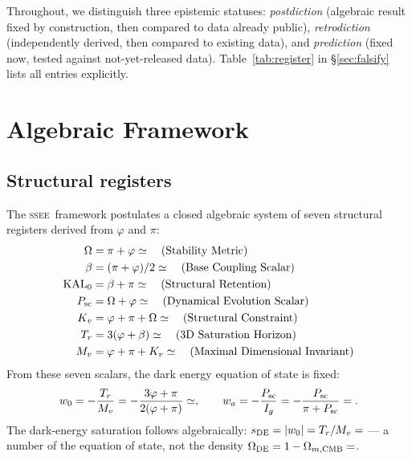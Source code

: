 \documentclass[12pt,a4paper]{article}
\newcommand{\SSEE}{\textsc{ssee}}
\newcommand{\phiG}{\varphi}
\newcommand{\KAL}{\mathrm{KAL}_0}
\newcommand{\Omde}{\Omega_{\mathrm{DE}}}
\newcommand{\OmmCMB}{\Omega_{m,\mathrm{CMB}}}
\newcommand{\wz}{w_0}
\newcommand{\wa}{w_a}
\begin{document}
Throughout, we distinguish three epistemic statuses: \textit{postdiction}
(algebraic result fixed by construction, then compared to data already public),
\textit{retrodiction} (independently derived, then compared to existing data),
and \textit{prediction} (fixed now, tested against not-yet-released data).
Table~\ref{tab:register} in \S\ref{sec:falsify} lists all entries explicitly.


\section{Algebraic Framework}
\label{sec:theory}

\subsection{Structural registers}
\label{sec:registers}

The \SSEE\ framework postulates a closed algebraic system of seven structural
registers derived from $\phiG$ and $\pi$:
\begin{align}
  \Omega   &= \pi + \phiG                   \simeq \val{OMEGA_d4} \quad (\text{Stability Metric})  \nonumber\\
  \beta    &= (\pi + \phiG)/2               \simeq \val{BETA_d4} \quad (\text{Base Coupling Scalar}) \nonumber\\
  \KAL     &= \beta + \pi                   \simeq \val{KAL0_d4} \quad (\text{Structural Retention}) \nonumber\\
  P_{\rm sc} &= \Omega + \phiG             \simeq \val{P_SC_d4} \quad (\text{Dynamical Evolution Scalar}) \nonumber\\
  K_v      &= \phiG + \pi + \Omega         \simeq \val{K_V_d4} \quad (\text{Structural Constraint}) \nonumber\\
  T_r      &= 3(\phiG + \beta)             \simeq \val{T_R_d4}\quad (\text{3D Saturation Horizon}) \nonumber\\
  M_v      &= \phiG + \pi + K_v           \simeq \val{M_V_d4}\quad (\text{Maximal Dimensional Invariant})
  \label{eq:registers}
\end{align}
From these seven scalars, the dark energy equation of state is fixed:
\begin{equation}
  \wz = -\frac{T_r}{M_v}
     = -\frac{3\phiG+\pi}{2(\phiG+\pi)} \simeq \val{W0_d5},
  \qquad
  \wa = -\frac{P_{\rm sc}}{I_g}
     = -\frac{P_{\rm sc}}{\pi+P_{\rm sc}} = \val{WA_d6}.
  \label{eq:wde}
\end{equation}
The dark-energy saturation follows algebraically:
$s_{\rm DE} = |{\wz}| = T_r/M_v = \val{S_DE_d6}$ --- a number of the equation of
state, not the density $\Omde = 1-\OmmCMB = \val{OMDE_DENS_d6}$.
\end{document}
